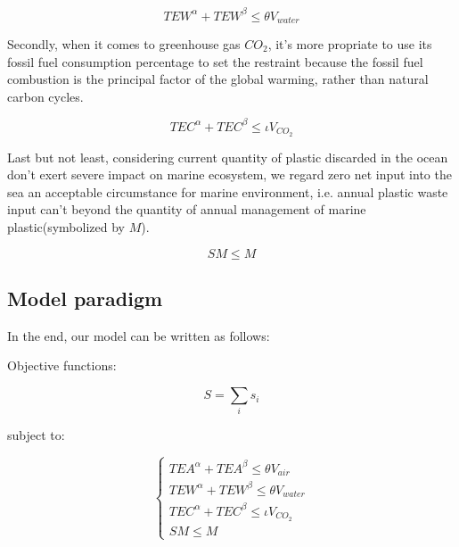 \documentclass{mcmthesis}
\begin{document}
\begin{equation}
TEW^\alpha + TEW^\beta \le \theta V_{water}
\label{water}
\end{equation}


Secondly, when it comes to greenhouse gas $CO_2$, it’s more propriate to use its fossil fuel consumption percentage to set the restraint because the fossil fuel combustion is the principal factor of the global warming, rather than natural carbon cycles\cite{book}.

\begin{equation}
TEC^\alpha + TEC^\beta \le \iota V_{CO_2}
\label{ECO}
\end{equation}


Last but not least, considering current quantity of plastic discarded in the ocean don’t exert severe impact on marine ecosystem, we regard zero net input into the sea an acceptable circumstance for marine environment, i.e. annual plastic waste input can’t beyond the quantity of annual management of marine plastic(symbolized by $M$).

\begin{equation}
SM \le M
\end{equation}


\subsection{Model paradigm}

In the end, our model can be written as follows:

Objective functions:

\begin{equation}
S = \sum_i{s_i}
\label{z}
\end{equation}

subject to:

\begin{equation}
\label{eq6}
\left\{
\begin{aligned}
TEA^\alpha + TEA^\beta \le \theta V_{air}\\
TEW^\alpha + TEW^\beta \le \theta V_{water}\\
TEC^\alpha + TEC^\beta \le \iota V_{CO_2}\\
SM \le M
\end{aligned}
\right.
\end{equation}
\end{document}
